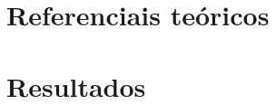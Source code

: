     \ifforcedinclude\else\part{Referenciais teóricos}\fi

    

    \ifforcedinclude\else\part{Resultados}\fi

    

    

    


    



    \postextual
    \setlength\beforechapskip{0pt}
    \setlength\midchapskip{15pt}
    \setlength\afterchapskip{15pt}

    


    \ifforcedinclude\else\begin{apendicesenv}
        \partapendices

        \setlength\beforechapskip{50pt}
        \setlength\midchapskip{20pt}
        \setlength\afterchapskip{20pt}

        
    \end{apendicesenv}\fi

    \ifforcedinclude\else\begin{anexosenv}
        \partanexos

        \setlength\beforechapskip{50pt}
        \setlength\midchapskip{20pt}
        \setlength\afterchapskip{20pt}

        
        
    \end{anexosenv}\fi

    \ifforcedinclude\else
        \printindex
    \fi



